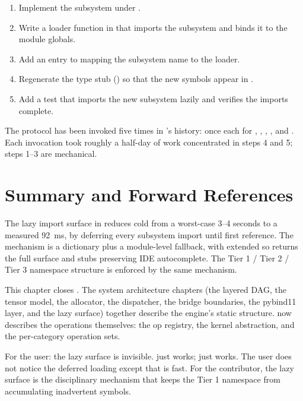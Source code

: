 \begin{enumerate}
  \item Implement the subsystem under .
  \item Write a loader function  in
     that imports the subsystem and binds
    it to the module globals.
  \item Add an entry to  mapping the
    subsystem name to the loader.
  \item Regenerate the type stub
    () so that the new symbols
    appear in .
  \item Add a test that imports the new subsystem lazily and
    verifies the imports complete.
\end{enumerate}

The protocol has been invoked five times in \Lucid's history: once
each for , , ,
, and . Each invocation took roughly a
half-day of work concentrated in steps 4 and 5; steps 1--3 are
mechanical.

\section{Summary and Forward References}
\label{sec:lazy_imports:summary}

The lazy import surface in  reduces
cold  from a worst-case 3--4 seconds to a
measured 92~ms, by deferring every subsystem import until first
reference. The mechanism is a  dictionary
plus a module-level  fallback, with
 extended so  returns the full
surface and  stubs preserving IDE autocomplete. The
Tier 1 / Tier 2 / Tier 3 namespace structure is enforced by the
same mechanism.

This chapter closes . The system architecture
chapters (the layered DAG, the tensor model, the allocator, the
dispatcher, the bridge boundaries, the pybind11 layer, and the
lazy surface) together describe the engine's static structure.
 now describes the operations themselves:
the op registry, the kernel abstraction, and the per-category
operation sets.

\begin{lucidnote}
For the user: the lazy surface is invisible. 
just works;  just works. The user does not
notice the deferred loading except that  is
fast. For the contributor, the lazy surface is the disciplinary
mechanism that keeps the Tier 1 namespace from accumulating
inadvertent symbols.
\end{lucidnote}
